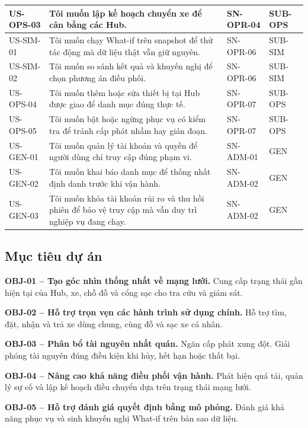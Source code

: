 \begin{longtable}{|L{22mm}|L{72mm}|L{23mm}|L{20mm}|}
  \hline
  US-OPS-03 & Tôi muốn lập kế hoạch chuyển xe để cân bằng các Hub. & SN-OPR-04 & SUB-OPS\\
  \hline
  US-SIM-01 & Tôi muốn chạy What-if trên snapshot để thử tác động mà dữ liệu thật vẫn giữ nguyên. & SN-OPR-06 & SUB-SIM\\
  \hline
  US-SIM-02 & Tôi muốn so sánh kết quả và khuyến nghị để chọn phương án điều phối. & SN-OPR-06 & SUB-SIM\\
  \hline
  US-OPS-04 & Tôi muốn thêm hoặc sửa thiết bị tại Hub được giao để danh mục đúng thực tế. & SN-OPR-07 & SUB-OPS\\
  \hline
  US-OPS-05 & Tôi muốn bật hoặc ngừng phục vụ có kiểm tra để tránh cấp phát nhầm hay gián đoạn. & SN-OPR-07 & SUB-OPS\\
  \hline
  US-GEN-01 & Tôi muốn quản lý tài khoản và quyền để người dùng chỉ truy cập đúng phạm vi. & SN-ADM-01 & GEN\\
  \hline
  US-GEN-02 & Tôi muốn khai báo danh mục để thống nhất định danh trước khi vận hành. & SN-ADM-02 & GEN\\
  \hline
  US-GEN-03 & Tôi muốn khóa tài khoản rủi ro và thu hồi phiên để bảo vệ truy cập mà vẫn duy trì nghiệp vụ đang chạy. & SN-ADM-02 & GEN\\
  \hline
\end{longtable}
\endgroup

\subsection{Mục tiêu dự án}

\noindent\textbf{OBJ-01 -- Tạo góc nhìn thống nhất về mạng lưới.} Cung cấp trạng thái gần hiện tại của Hub, xe, chỗ đỗ và cổng sạc cho tra cứu và giám sát.

\medskip
\noindent\textbf{OBJ-02 -- Hỗ trợ trọn vẹn các hành trình sử dụng chính.} Hỗ trợ tìm, đặt, nhận và trả xe dùng chung, cùng đỗ và sạc xe cá nhân.

\medskip
\noindent\textbf{OBJ-03 -- Phân bổ tài nguyên nhất quán.} Ngăn cấp phát xung đột. Giải phóng tài nguyên đúng điều kiện khi hủy, hết hạn hoặc thất bại.

\medskip
\noindent\textbf{OBJ-04 -- Nâng cao khả năng điều phối vận hành.} Phát hiện quá tải, quản lý sự cố và lập kế hoạch điều chuyển dựa trên trạng thái mạng lưới.

\medskip
\noindent\textbf{OBJ-05 -- Hỗ trợ đánh giá quyết định bằng mô phỏng.} Đánh giá khả năng phục vụ và sinh khuyến nghị What-if trên bản sao dữ liệu.

